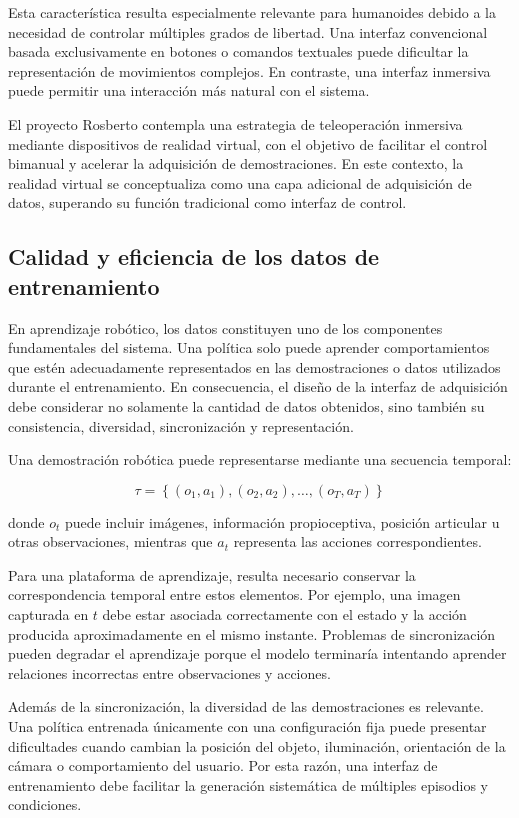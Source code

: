 \documentclass[stu,12pt,floatsintext]{apa7}
\begin{document}
Esta característica resulta especialmente relevante para humanoides debido a la necesidad de controlar múltiples grados de libertad. Una interfaz convencional basada exclusivamente en botones o comandos textuales puede dificultar la representación de movimientos complejos. En contraste, una interfaz inmersiva puede permitir una interacción más natural con el sistema.

El proyecto Rosberto contempla una estrategia de teleoperación inmersiva mediante dispositivos de realidad virtual, con el objetivo de facilitar el control bimanual y acelerar la adquisición de demostraciones. En este contexto, la realidad virtual se conceptualiza como una capa adicional de adquisición de datos, superando su función tradicional como interfaz de control.

\subsection{Calidad y eficiencia de los datos de entrenamiento}

En aprendizaje robótico, los datos constituyen uno de los componentes fundamentales del sistema. Una política solo puede aprender comportamientos que estén adecuadamente representados en las demostraciones o datos utilizados durante el entrenamiento. En consecuencia, el diseño de la interfaz de adquisición debe considerar no solamente la cantidad de datos obtenidos, sino también su consistencia, diversidad, sincronización y representación.

Una demostración robótica puede representarse mediante una secuencia temporal:

\begin{equation}
\tau = \left\{(o_1,a_1),(o_2,a_2),\ldots,(o_T,a_T)\right\}
\end{equation}

donde $o_t$ puede incluir imágenes, información propioceptiva, posición articular u otras observaciones, mientras que $a_t$ representa las acciones correspondientes.

Para una plataforma de aprendizaje, resulta necesario conservar la correspondencia temporal entre estos elementos. Por ejemplo, una imagen capturada en $t$ debe estar asociada correctamente con el estado y la acción producida aproximadamente en el mismo instante. Problemas de sincronización pueden degradar el aprendizaje porque el modelo terminaría intentando aprender relaciones incorrectas entre observaciones y acciones.

Además de la sincronización, la diversidad de las demostraciones es relevante. Una política entrenada únicamente con una configuración fija puede presentar dificultades cuando cambian la posición del objeto, iluminación, orientación de la cámara o comportamiento del usuario. Por esta razón, una interfaz de entrenamiento debe facilitar la generación sistemática de múltiples episodios y condiciones.
\end{document}
